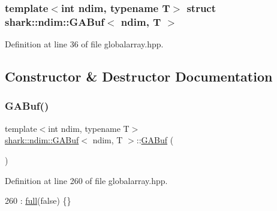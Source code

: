 \subsubsection*{template$<$int ndim, typename T$>$\newline
struct shark\+::ndim\+::\+G\+A\+Buf$<$ ndim, T $>$}



Definition at line 36 of file globalarray.\+hpp.



\subsection{Constructor \& Destructor Documentation}
\hypertarget{classshark_1_1ndim_1_1_g_a_buf_a66e3b3963eabbac578716e5d1e971f6b}{}\label{classshark_1_1ndim_1_1_g_a_buf_a66e3b3963eabbac578716e5d1e971f6b} 
\subsubsection{\texorpdfstring{G\+A\+Buf()}{GABuf()}\hspace{0.1cm}{\footnotesize\ttfamily [1/2]}}
{\footnotesize\ttfamily template$<$int ndim, typename T$>$ \\
\hyperlink{classshark_1_1ndim_1_1_g_a_buf}{shark\+::ndim\+::\+G\+A\+Buf}$<$ ndim, T $>$\+::\hyperlink{classshark_1_1ndim_1_1_g_a_buf}{G\+A\+Buf} (\begin{DoxyParamCaption}{ }\end{DoxyParamCaption})\hspace{0.3cm}{\ttfamily [inline]}}



Definition at line 260 of file globalarray.\+hpp.


\begin{DoxyCode}
260 : \hyperlink{classshark_1_1ndim_1_1_g_a_buf_ac5dd94b05ab78e812b0831dbb2651584}{full}(\textcolor{keyword}{false}) \{\}
\end{DoxyCode}
\hypertarget{classshark_1_1ndim_1_1_g_a_buf_a9cddb291657305e457de784f5bfe6510}{}\label{classshark_1_1ndim_1_1_g_a_buf_a9cddb291657305e457de784f5bfe6510} 
